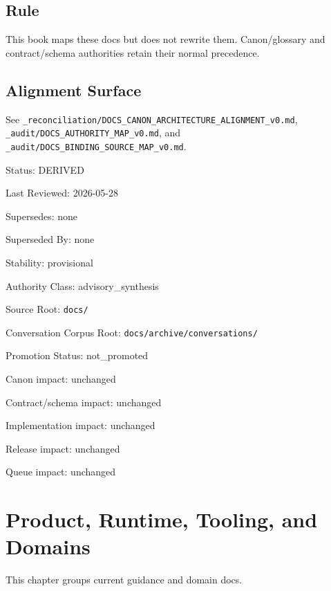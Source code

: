 \documentclass[10.5pt,a4paper]{book}
\begin{document}
\chapter{Rule}

This book maps these docs but does not rewrite them.\allowbreak{} Canon/\allowbreak{}glossary and contract/\allowbreak{}schema authorities retain their normal precedence.\allowbreak{}


\chapter{Alignment Surface}

See \texttt{\_\allowbreak{}reconciliation/\allowbreak{}DOCS\_\allowbreak{}CANON\_\allowbreak{}ARCHITECTURE\_\allowbreak{}ALIGNMENT\_\allowbreak{}v0.\allowbreak{}md}, \texttt{\_\allowbreak{}audit/\allowbreak{}DOCS\_\allowbreak{}AUTHORITY\_\allowbreak{}MAP\_\allowbreak{}v0.\allowbreak{}md}, and \texttt{\_\allowbreak{}audit/\allowbreak{}DOCS\_\allowbreak{}BINDING\_\allowbreak{}SOURCE\_\allowbreak{}MAP\_\allowbreak{}v0.\allowbreak{}md}.\allowbreak{}



Status: DERIVED

Last Reviewed: 2026-\allowbreak{}05-\allowbreak{}28

Supersedes: none

Superseded By: none

Stability: provisional

Authority Class: advisory\_\allowbreak{}synthesis

Source Root: \texttt{docs/\allowbreak{}}

Conversation Corpus Root: \texttt{docs/\allowbreak{}archive/\allowbreak{}conversations/\allowbreak{}}

Promotion Status: not\_\allowbreak{}promoted

Canon impact: unchanged

Contract/\allowbreak{}schema impact: unchanged

Implementation impact: unchanged

Release impact: unchanged

Queue impact: unchanged


\part{Product, Runtime, Tooling, and Domains}

This chapter groups current guidance and domain docs.\allowbreak{}
\end{document}
